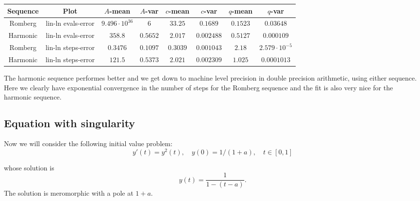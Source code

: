 \begin{table}[H]
    \centering
    \small
     \begin{tabular}{c|c||c|c|c|c|c|c}
Sequence & Plot & \(A\)-mean & \(A\)-var & \(c\)-mean & \(c\)-var & \(q\)-mean & \(q\)-var\\\hline
\rowcolor{red}
Romberg & lin-ln evals-error & \(9.496\cdot 10^{36}\) & \(6\) & \(33.25\) & \(0.1689\) & \(0.1523\) & \(0.03648\) \\
\rowcolor{green}
Harmonic & lin-ln evals-error & \(358.8\) & \(0.5652\) & \(2.017\) & \(0.002488\) & \(0.5127\) & \(0.000109\) \\
\rowcolor{green}
Romberg & lin-ln steps-error & \(0.3476\) & \(0.1097\) & \(0.3039\) & \(0.001043\) & \(2.18\) & \(2.579\cdot 10^{-5}\) \\
\rowcolor{green}
Harmonic & lin-ln steps-error & \(121.5\) & \(0.5373\) & \(2.021\) & \(0.002309\) & \(1.025\) & \(0.0001013\) \\
    \end{tabular}
    \label{tab:my_label}
\end{table}

The harmonic sequence performes better and we get down to machine level precision in double precision arithmetic, using either sequence.\\

Here we clearly have exponential convergence in the number of steps for the Romberg sequence and the fit is also very nice for the harmonic sequence.

\subsection{Equation with singularity}

Now we will consider the following initial value problem:
\begin{equation}\label{46}
y'(t) = y^2(t),\quad y(0) = 1/(1+a), \quad t\in [0,1]
\end{equation}

whose solution is 
\[
y(t) = \frac{1}{1-(t-a)}.
\]
The solution is meromorphic with a pole at \(1+a\).


